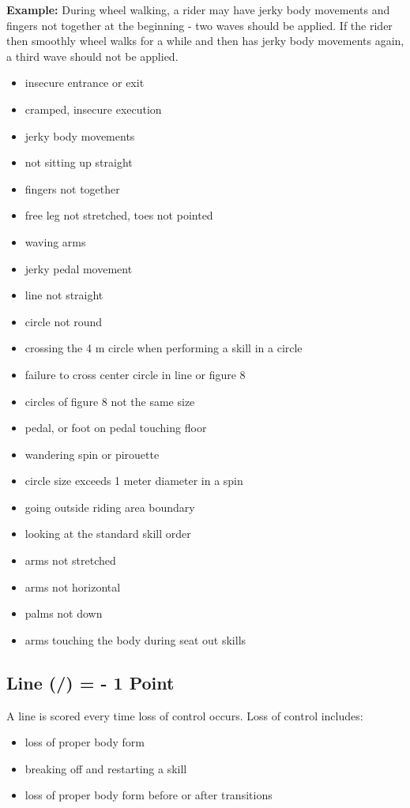\textbf{Example:} During wheel walking, a rider may have jerky body movements and fingers not together at the beginning - two waves should be applied.
If the rider then smoothly wheel walks for a while and then has jerky body movements again, a third wave should not be applied.
\begin{itemize}
\item insecure entrance or exit
\item cramped, insecure execution
\item jerky body movements
\item not sitting up straight
\item fingers not together
\item free leg not stretched, toes not pointed
\item waving arms
\item jerky pedal movement
\item line not straight
\item circle not round
\item crossing the 4 m circle when performing a skill in a circle
\item failure to cross center circle in line or figure 8
\item circles of figure 8 not the same size
\item pedal, or foot on pedal touching floor
\item wandering spin or pirouette
\item circle size exceeds 1 meter diameter in a spin
\item going outside riding area boundary
\item looking at the standard skill order
\item arms not stretched
\item arms not horizontal
\item palms not down
\item arms touching the body during seat out skills
\end{itemize}

\subsection{Line (/) = - 1 Point}
A line is scored every time loss of control occurs.
Loss of control includes:
\begin{itemize}
\item loss of proper body form
\item breaking off and restarting a skill
\item loss of proper body form before or after transitions
\end{itemize}

